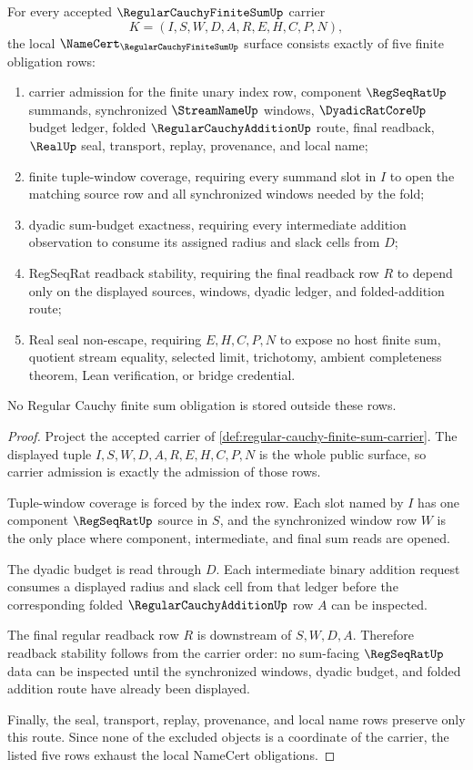 \begin{theorem}\label{thm:regular-cauchy-finite-sum-namecert-obligations}
For every accepted $\RegularCauchyFiniteSumUp$ carrier
$$
K=(I,S,W,D,A,R,E,H,C,P,N),
$$
the local $\NameCert_{\RegularCauchyFiniteSumUp}$ surface consists exactly of five finite obligation rows:
\begin{enumerate}
\item carrier admission for the finite unary index row, component $\RegSeqRatUp$ summands, synchronized $\StreamNameUp$ windows, $\DyadicRatCoreUp$ budget ledger, folded $\RegularCauchyAdditionUp$ route, final readback, $\RealUp$ seal, transport, replay, provenance, and local name;
\item finite tuple-window coverage, requiring every summand slot in $I$ to open the matching source row and all synchronized windows needed by the fold;
\item dyadic sum-budget exactness, requiring every intermediate addition observation to consume its assigned radius and slack cells from $D$;
\item RegSeqRat readback stability, requiring the final readback row $R$ to depend only on the displayed sources, windows, dyadic ledger, and folded-addition route;
\item Real seal non-escape, requiring $E,H,C,P,N$ to expose no host finite sum, quotient stream equality, selected limit, trichotomy, ambient completeness theorem, Lean verification, or bridge credential.
\end{enumerate}
No Regular Cauchy finite sum obligation is stored outside these rows.
\end{theorem}
\begin{proof}
Project the accepted carrier of \autoref{def:regular-cauchy-finite-sum-carrier}. The displayed tuple $I,S,W,D,A,R,E,H,C,P,N$ is the whole public surface, so carrier admission is exactly the admission of those rows.

Tuple-window coverage is forced by the index row. Each slot named by $I$ has one component $\RegSeqRatUp$ source in $S$, and the synchronized window row $W$ is the only place where component, intermediate, and final sum reads are opened.

The dyadic budget is read through $D$. Each intermediate binary addition request consumes a displayed radius and slack cell from that ledger before the corresponding folded $\RegularCauchyAdditionUp$ row $A$ can be inspected.

The final regular readback row $R$ is downstream of $S,W,D,A$. Therefore readback stability follows from the carrier order: no sum-facing $\RegSeqRatUp$ data can be inspected until the synchronized windows, dyadic budget, and folded addition route have already been displayed.

Finally, the seal, transport, replay, provenance, and local name rows preserve only this route. Since none of the excluded objects is a coordinate of the carrier, the listed five rows exhaust the local NameCert obligations.
\end{proof}

